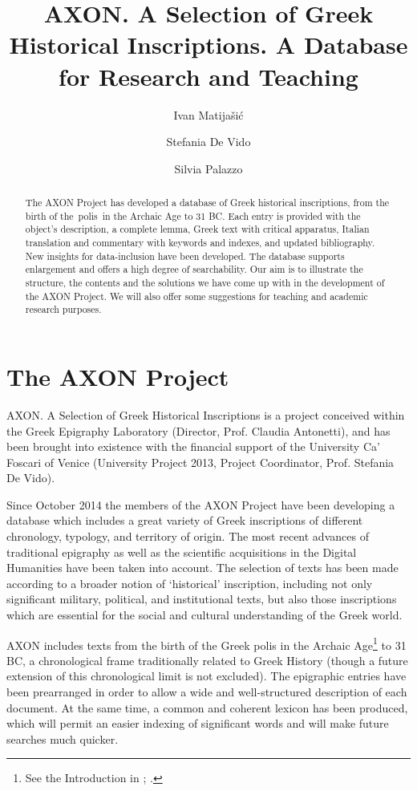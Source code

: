 \documentclass[amsthm,ebook]{saparticle}
\title{AXON. A Selection of Greek Historical Inscriptions. A Database for Research and Teaching}
\author[cafo]{Ivan Matijašić\corref{first}}
\author[cafo]{Stefania De Vido}
\author[cafo]{Silvia Palazzo}
\begin{document}
\maketitle
\begin{abstract}
The AXON Project has developed a database of Greek historical inscriptions, from the birth of the~polis~in the Archaic
Age to 31 BC. Each entry is provided with the object’s description, a complete lemma, Greek text with critical
apparatus, Italian translation and commentary with keywords and indexes, and updated bibliography. New insights for
data-inclusion have been developed. The database supports enlargement and offers a high degree of searchability. Our
aim is to illustrate the structure, the contents and the solutions we have come up with in the development of the AXON
Project. We will also offer some suggestions for teaching and academic research purposes.


\end{abstract}




\section{The AXON Project }


AXON. A Selection of Greek Historical Inscriptions is a project conceived within the Greek Epigraphy Laboratory
(Director, Prof. Claudia Antonetti), and has been brought into existence with the financial support of the University
Ca’ Foscari of Venice (University Project 2013, Project Coordinator, Prof. Stefania De Vido).

Since October 2014 the members of the AXON Project have been developing a database which includes a great variety of
Greek inscriptions of different chronology, typology, and territory of origin. The most recent advances of traditional
epigraphy as well as the scientific acquisitions in the Digital Humanities have been taken into account. The selection
of texts has been made according to a broader notion of ‘historical’ inscription, including not only significant
military, political, and institutional texts, but also those inscriptions which are essential for the social and
cultural understanding of the Greek world. 

AXON includes texts from the birth of the Greek polis in the Archaic Age\footnote{ See the Introduction in \citet{nielsen_inventory_2004}; \citet{hansen_polis:_2006}. } to 31 BC, a chronological frame traditionally related to Greek History (though a future
extension of this chronological limit is not excluded). The epigraphic entries have been prearranged in order to allow
a wide and well-structured description of each document. At the same time, a common and coherent lexicon has been
produced, which will permit an easier indexing of significant words and will make future searches much quicker. 
\end{document}
